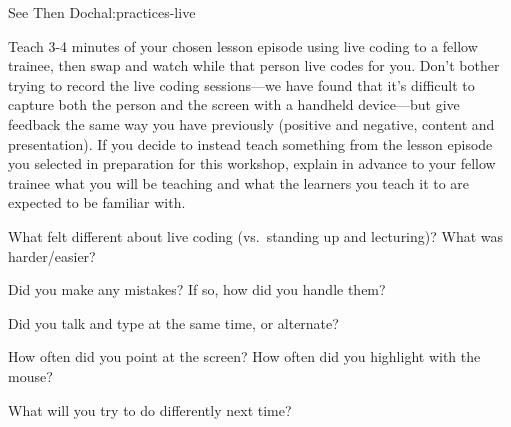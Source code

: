 \begin{challenge}{See Then Do}{chal:practices-live}

Teach 3-4 minutes of your chosen lesson episode using live coding to a
fellow trainee, then swap and watch while that person live codes for
you. Don't bother trying to record the live coding sessions---we have
found that it's difficult to capture both the person and the screen
with a handheld device---but give feedback the same way you have
previously (positive and negative, content and presentation). If you
decide to instead teach something from the lesson episode you selected
in preparation for this workshop, explain in advance to your fellow
trainee what you will be teaching and what the learners you teach it
to are expected to be familiar with.

\begin{gitemize}

  \item
    What felt different about live coding (vs.~standing up and
    lecturing)? What was harder/easier?

  \item
    Did you make any mistakes? If so, how did you handle them?

  \item
    Did you talk and type at the same time, or alternate?

  \item
    How often did you point at the screen? How often did you highlight
    with the mouse?

  \item
    What will you try to do differently next time?

\end{gitemize}

\end{challenge}
